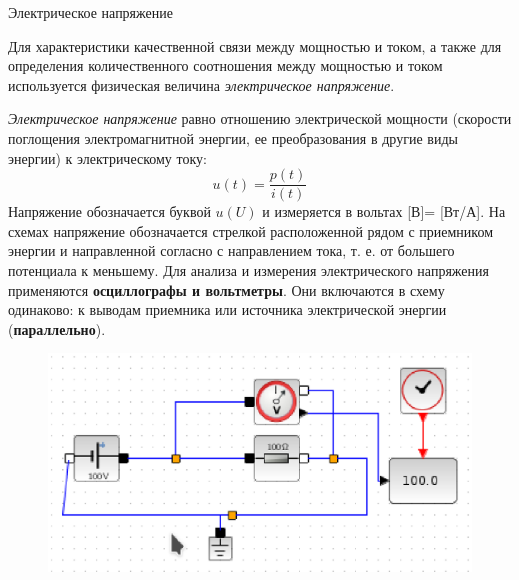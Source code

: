 \documentclass[12pt, pdf, hyperref={unicode},handout]{beamer}
\begin{document}
\begin{frame}{Электрическое напряжение}
  \begin{block}

    \small{
Для характеристики качественной связи между мощностью и током, а также для определения количественного соотношения между мощностью и током используется физическая величина
\textit{электрическое напряжение}.

\textit{Электрическое напряжение}  равно отношению электрической мощности (скорости поглощения электромагнитной энергии, ее преобразования в другие виды энергии) к электрическому току: $$u(t)=\frac{p(t)}{i(t)}$$
Напряжение обозначается буквой $u (U)$ и измеряется в вольтах [В]= [Вт/А]. На схемах напряжение обозначается стрелкой расположенной рядом с приемником энергии и направленной согласно с направлением тока, т. е. от большего потенциала к меньшему. Для анализа и измерения электрического напряжения применяются \textbf{осциллографы и вольтметры}. Они включаются в схему одинаково: к выводам приемника или источника электрической энергии (\textbf{параллельно}).
\begin{figure}[htb] 
    \centering
    \includegraphics [scale=0.7]{ris2.eps}
  \end{figure}

}

  \end{block}
  
\end{frame}
\end{document}
